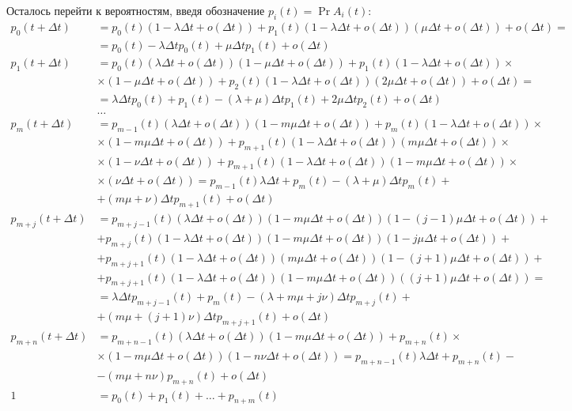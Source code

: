 Осталось перейти к вероятностям, введя обозначение \(p_{i}(t) = \Pr{A_{i}(t)}\):
\begin{align*}
	p_{0}(t + \Delta t) &= p_{0}(t)(1 - \lambda\Delta t + o(\Delta t)) + 
	p_{1}(t)(1 - \lambda\Delta t + o(\Delta t))(\mu \Delta t + o(\Delta t)) + 
	o(\Delta t) = \\
	&= p_{0}(t) - \lambda \Delta t p_{0}(t) + \mu\Delta t p_{1}(t) + o(\Delta 
	t) \\
	p_{1}(t + \Delta t) &= p_{0}(t)(\lambda\Delta t + o(\Delta t))(1 - 
	\mu\Delta t + o(\Delta t)) + p_{1}(t)(1 - \lambda\Delta t + o(\Delta 
	t))\times \\ &\times (1 - \mu\Delta t + o(\Delta t)) + p_{2}(t)(1 - 
	\lambda\Delta t + o(\Delta t))(2\mu\Delta t + o(\Delta t)) + o(\Delta 
	t) = \\
	&= \lambda\Delta t p_{0}(t) + p_{1}(t) - (\lambda + \mu)\Delta t p_{1}(t) + 
	2\mu\Delta t p_{2}(t) + o(\Delta t) \\
	&\ldots \\
	p_{m}(t + \Delta t) &= p_{m - 1}(t)(\lambda\Delta t + o(\Delta 
	t))(1 - m\mu\Delta t + o(\Delta t)) + p_{m}(t)(1 - \lambda\Delta t + 
	o(\Delta t))\times \\ &\times (1 - m\mu\Delta t + o(\Delta t)) + p_{m + 
	1}(t)(1 - \lambda\Delta t + o(\Delta t))(m\mu\Delta t + o(\Delta t)) \times 
	\\ &\times (1 - \nu\Delta t + o(\Delta t)) + p_{m + 
	1}(t)(1 - \lambda\Delta t + o(\Delta t))(1 - m\mu\Delta t + o(\Delta t)) 
	\times \\ &\times (\nu\Delta t + o(\Delta t)) = p_{m - 1}(t)\lambda\Delta t 
	+ p_{m}(t) - (\lambda + \mu)\Delta t p_{m}(t) + \\ &+ (m\mu + \nu)\Delta t 
	p_{m + 1}(t) + o(\Delta t) \\
	p_{m + j}(t + \Delta t) &= p_{m + j - 1}(t)(\lambda\Delta t + o(\Delta 
	t))(1 - m\mu\Delta t + o(\Delta t))(1 - (j - 1)\mu\Delta t + o(\Delta t)) + 
	\\ &+ p_{m + j}(t)(1 - \lambda\Delta t + o(\Delta t))(1 - m\mu\Delta t + 
	o(\Delta t))(1 - j\mu\Delta t + o(\Delta t)) + \\ &+ p_{m + j + 1}(t)(1 - 
	\lambda\Delta t + o(\Delta t))(m\mu\Delta t + o(\Delta t))(1 - (j + 
	1)\mu\Delta t + o(\Delta t)) + \\ &+ p_{m + j + 1}(t)(1 - \lambda\Delta t + 
	o(\Delta t))(1 - m\mu\Delta t + o(\Delta t))((j + 1)\mu\Delta t + 
	o(\Delta t)) = \\ &= \lambda \Delta t p_{m + j - 1}(t) + p_{m}(t) - 
	(\lambda + m\mu + j\nu)\Delta t p_{m + j}(t) + \\ &+ (m\mu + (j + 
	1)\nu)\Delta t p_{m + j + 1}(t) + o(\Delta t) \\
	p_{m + n}(t + \Delta t) &= p_{m + n - 1}(t)(\lambda\Delta t + o(\Delta 
	t))(1 - m\mu\Delta t + o(\Delta t)) + p_{m + n}(t) \times \\ &\times (1 - 
	m\mu\Delta t + o(\Delta t))(1 - n\nu\Delta t + o(\Delta t)) = p_{m + n 
	- 1}(t)\lambda \Delta t + p_{m + n}(t) - \\ &- (m\mu + n\nu)p_{m + n}(t) + 
	o(\Delta t) \\
	1 &= p_{0}(t) + p_{1}(t) + \ldots + p_{n + m}(t)
\end{align*}

